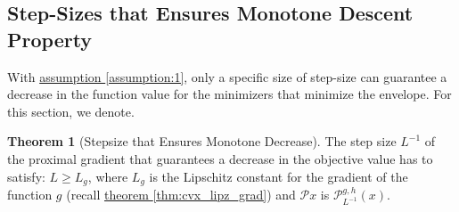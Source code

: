 \documentclass[]{article}
\theoremstyle{definition}
\newtheorem{theorem}{Theorem}       %
\begin{document}
    \subsection{Step-Sizes that Ensures Monotone Descent Property}
        With \hyperref[assumption:1]{assumption \ref*{assumption:1}}, only a specific size of step-size can guarantee a decrease in the function value for the minimizers that minimize the envelope. For this section, we denote. 
        \begin{theorem}[Stepsize that Ensures Monotone Decrease]\label{thm:monotone_decrease}
            The step size $L^{-1}$ of the proximal gradient that guarantees a decrease in the objective value has to satisfy: $L \ge L_g$, where $L_g$ is the Lipschitz constant for the gradient of the function $g$ (recall \hyperref[thm:cvx_lipz_grad]{theorem \ref*{thm:cvx_lipz_grad}}) and $\mathcal Px$ is $\mathcal P_{L^{-1}}^{g, h}(x)$. 
        \end{theorem}
\end{document}
